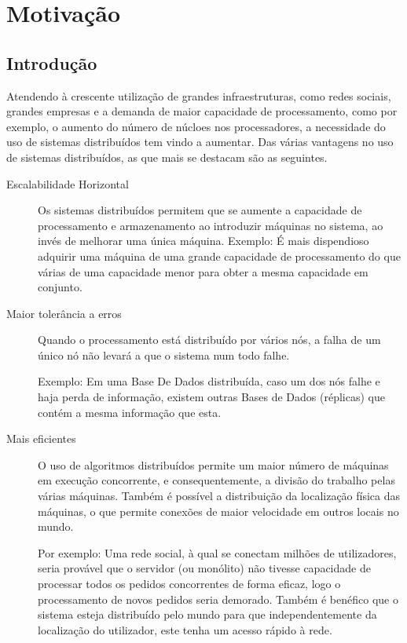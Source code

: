 \chapter{Motivação}
\label{chap:estado-da-arte}

\section{Introdução}
\label{chap2:sec:intro}


Atendendo à crescente utilização de grandes infraestruturas, como redes sociais, grandes empresas e a demanda de maior capacidade de processamento, como por exemplo, o aumento do número de núcloes nos processadores, a necessidade do uso de sistemas distribuídos tem vindo a aumentar.
Das várias vantagens no uso de sistemas distribuídos, as que mais se destacam são as seguintes.
\begin{description}
    \item [Escalabilidade Horizontal] Os sistemas distribuídos permitem que se aumente a capacidade de processamento e armazenamento ao introduzir máquinas no sistema, ao invés de melhorar uma única máquina.
	Exemplo: É mais dispendioso adquirir uma máquina de uma grande capacidade de processamento do que várias de uma capacidade menor para obter a mesma capacidade em conjunto.


    \item [Maior tolerância a erros]Quando o processamento está distribuído por vários nós, a falha de um único nó não levará a que o sistema num todo falhe.

	Exemplo: Em uma Base De Dados distribuída, caso um dos nós falhe e haja perda de informação, existem outras Bases de Dados (réplicas) que contém a mesma informação que esta.


    \item [Mais eficientes] O uso de algoritmos distribuídos permite um maior número de máquinas em execução concorrente, e consequentemente, a divisão do trabalho pelas várias máquinas.
	Também é possível a distribuição da localização física das máquinas, o que permite conexões de maior velocidade em outros locais no mundo.

	Por exemplo: Uma rede social, à qual se conectam milhões de utilizadores, seria provável que o servidor (ou monólito) não tivesse capacidade de processar todos os pedidos concorrentes de forma eficaz, logo o processamento de novos pedidos seria demorado. Também é benéfico que o sistema esteja distribuído pelo mundo para que independentemente da localização do utilizador, este tenha um acesso rápido à rede.



\end{description}

